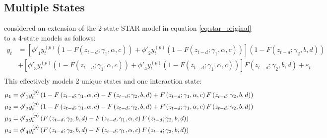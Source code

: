 \subsection{Multiple States}
\cite{Dijk1999} considered an extension of the 2-state STAR model in equation
\ref{eq:star_original} to a 4-state models as follows:
\begin{equation}\label{eq:mrstar_original}
\begin{split}
{y_t} &= \left[ {{{\phi '}_1}y_t^{\left( p \right)}\left( {1 - F\left( {{z_{t - d}};{\gamma _1},\alpha ,c} \right)} \right) + {{\phi '}_2}y_t^{\left( p \right)}\left( {1 - F\left( {{z_{t - d}};{\gamma _1},\alpha ,c} \right)} \right)} \right]\left( {1 - F\left( {{z_{t - d}};{\gamma _2},b,d} \right)} \right)\\
&+\left[ {{{\phi '}_3}y_t^{\left( p \right)}\left( {1 - F\left( {{z_{t - d}};{\gamma _1},\alpha ,c} \right)} \right) + {{\phi '}_4}y_t^{\left( p \right)}\left( {1 - F\left( {{z_{t - d}};{\gamma _1},\alpha ,c} \right)} \right)} \right]F\left( {{z_{t - d}};{\gamma _2},b,d} \right) + {\varepsilon _t}\\
\end{split}
\end{equation}
This effectively models 2 unique states and one interaction state:
\begin{equation}
\begin{gathered}
  {\mu _1} = {{\phi '}_1}y_t^{\left( p \right)}\left( {1 - F\left( {{z_{t - d}};{\gamma _1},\alpha ,c} \right) - F\left( {{z_{t - d}};{\gamma _2},b,d} \right) + F\left( {{z_{t - d}};{\gamma _1},\alpha ,c} \right)F\left( {{z_{t - d}};{\gamma _2},b,d} \right)} \right) \hfill \\
  {\mu _2} = {{\phi '}_2}y_t^{\left( p \right)}\left( {1 - F\left( {{z_{t - d}};{\gamma _1},\alpha ,c} \right) - F\left( {{z_{t - d}};{\gamma _2},b,d} \right) + F\left( {{z_{t - d}};{\gamma _1},\alpha ,c} \right)F\left( {{z_{t - d}};{\gamma _2},b,d} \right)} \right) \hfill \\
  {\mu _3} = {{\phi '}_3}y_t^{\left( p \right)}\left( {F\left( {{z_{t - d}};{\gamma _2},b,d} \right) - F\left( {{z_{t - d}};{\gamma _1},\alpha ,c} \right)F\left( {{z_{t - d}};{\gamma _2},b,d} \right)} \right) \hfill \\
  {\mu _4} = {{\phi '}_4}y_t^{\left( p \right)}\left( {F\left( {{z_{t - d}};{\gamma _2},b,d} \right) - F\left( {{z_{t - d}};{\gamma _1},\alpha ,c} \right)F\left( {{z_{t - d}};{\gamma _2},b,d} \right)} \right) \hfill \\
\end{gathered}
\end{equation}
